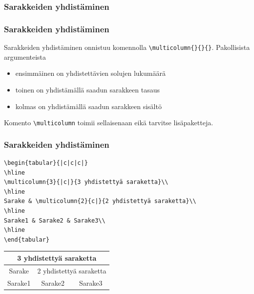\documentclass[handout]{beamer}
\theoremstyle{remark}
\begin{document}
\subsubsection{Sarakkeiden yhdistäminen}
\begin{frame}[fragile]
\frametitle{Sarakkeiden yhdistäminen}
Sarakkeiden yhdistäminen onnistuu komennolla \verb-\multicolumn{}{}{}-. Pakollisista argumenteista
\begin{itemize}
\item ensimmäinen on yhdistettävien solujen lukumäärä
\item toinen on yhdistämällä saadun sarakkeen tasaus
\item kolmas on yhdistämällä saadun sarakkeen sisältö
\end{itemize}
Komento \verb-\multicolumn- toimii sellaisenaan eikä tarvitse lisäpaketteja.
\end{frame}
\begin{frame}[fragile]
\frametitle{Sarakkeiden yhdistäminen}
\begin{scriptsize}
\begin{Verbatim}[frame=single]
\begin{tabular}{|c|c|c|}
\hline
\multicolumn{3}{|c|}{3 yhdistettyä saraketta}\\
\hline
Sarake & \multicolumn{2}{c|}{2 yhdistettyä saraketta}\\
\hline
Sarake1 & Sarake2 & Sarake3\\
\hline
\end{tabular}
\end{Verbatim}
\end{scriptsize}
\begin{minipage}{5cm}
\begin{scriptsize}
\begin{tabular}{|c|c|c|}
\hline
\multicolumn{3}{|c|}{3 yhdistettyä saraketta}\\
\hline
Sarake & \multicolumn{2}{c|}{2 yhdistettyä saraketta}\\
\hline
 Sarake1 & Sarake2 & Sarake3\\
 \hline
\end{tabular}
\end{scriptsize}
\end{minipage}
\end{frame}
\end{document}
